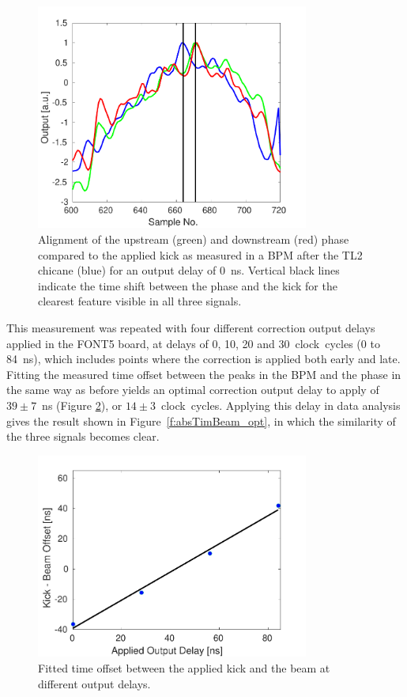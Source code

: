 \begin{figure}
  \centering
  \includegraphics[width=0.8\textwidth]{Figures/commissioning/absTimBeam_d0}
  \caption{Alignment of the upstream (green) and downstream (red) phase compared to the applied kick as measured in a BPM after the TL2 chicane (blue) for an output delay of 0~ns. Vertical black lines indicate the time shift between the phase and the kick for the clearest feature visible in all three signals.}
  \label{f:absTimBeam_d0}
\end{figure}

This measurement was repeated with four different correction output delays applied in the FONT5 board, at delays of 0, 10, 20 and 30~clock~cycles (0 to 84~ns), which includes points where the correction is applied both early and late. Fitting the measured time offset between the peaks in the BPM and the phase in the same way as before yields an optimal correction output delay to apply of \(39\pm7\)~ns (Figure \ref{f:absTimBeam_fit}), or \(14\pm3\)~clock~cycles. Applying this delay in data analysis gives the result shown in Figure~\ref{f:absTimBeam_opt}, in which the similarity of the three signals becomes clear.

\begin{figure}
  \centering
  \includegraphics[width=0.8\textwidth]{Figures/commissioning/absTimBeam_fit}
  \caption{Fitted time offset between the applied kick and the beam at different output delays.}
  \label{f:absTimBeam_fit}
\end{figure}

